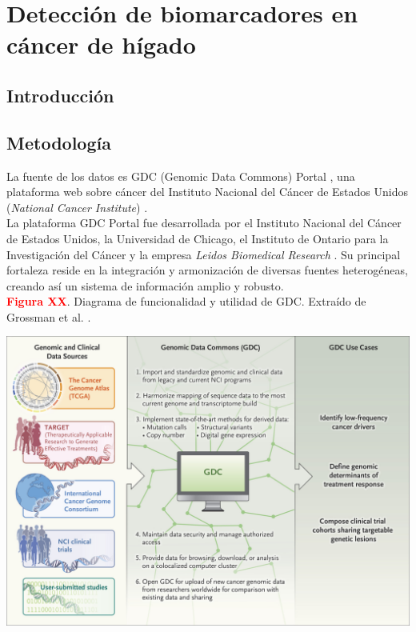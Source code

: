 \chapter{Detección de biomarcadores en cáncer de hígado}

\section{Introducción}

\section{Metodología}

La fuente de los datos es GDC (Genomic Data Commons) Portal \cite{GDCPortal}, una plataforma web sobre cáncer del Instituto Nacional del Cáncer de Estados Unidos (\textit{National Cancer Institute}) \cite{NationalCancerInstitute}.\\

La plataforma GDC Portal fue desarrollada por el Instituto Nacional del Cáncer de Estados Unidos, la Universidad de Chicago, el Instituto de Ontario para la Investigación del Cáncer y la empresa \textit{Leidos Biomedical Research} \cite{Grossman2016}. Su principal fortaleza reside en la integración y armonización de diversas fuentes heterogéneas, creando así un sistema de información amplio y robusto. \\

\newpage
\textbf{\textcolor{red}{Figura XX}}. Diagrama de funcionalidad y utilidad de GDC. Extraído de Grossman et al. \cite{Grossman2016}.
\begin{center}
	\includegraphics[width=1\textwidth]{figuras/funcionamiento_gdc.jpeg} \\
\end{center}

